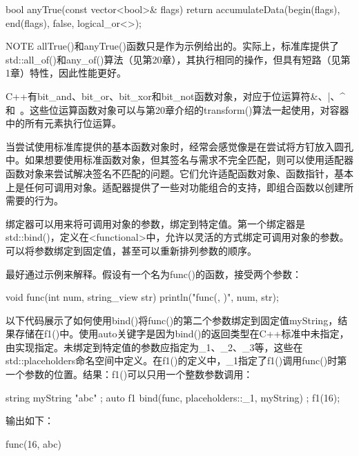\begin{cpp}
bool anyTrue(const vector<bool>& flags)
{
    return accumulateData(begin(flags), end(flags), false, logical_or<>{});
}
\end{cpp}

\begin{myNotic}{NOTE}
allTrue()和anyTrue()函数只是作为示例给出的。实际上，标准库提供了std::all\_of()和any\_of()算法（见第20章），其执行相同的操作，但具有短路（见第1章）特性，因此性能更好。
\end{myNotic}


C++有bit\_and、bit\_or、bit\_xor和bit\_not函数对象，对应于位运算符\&、|、\^{}和~。这些位运算函数对象可以与第20章介绍的transform()算法一起使用，对容器中的所有元素执行位运算。


当尝试使用标准库提供的基本函数对象时，经常会感觉像是在尝试将方钉放入圆孔中。如果想要使用标准函数对象，但其签名与需求不完全匹配，则可以使用适配器函数对象来尝试解决签名不匹配的问题。它们允许适配函数对象、函数指针，基本上是任何可调用对象。适配器提供了一些对功能组合的支持，即组合函数以创建所需要的行为。


绑定器可以用来将可调用对象的参数，绑定到特定值。第一个绑定器是std::bind()，定义在<functional>中，允许以灵活的方式绑定可调用对象的参数。可以将参数绑定到固定值，甚至可以重新排列参数的顺序。

最好通过示例来解释。假设有一个名为func()的函数，接受两个参数：

\begin{cpp}
void func(int num, string_view str)
{
    println("func({}, {})", num, str);
}
\end{cpp}

以下代码展示了如何使用bind()将func()的第二个参数绑定到固定值myString，结果存储在f1()中。使用auto关键字是因为bind()的返回类型在C++标准中未指定，由实现指定。未绑定到特定值的参数应指定为\_1、\_2、\_3等，这些在std::placeholders命名空间中定义。在f1()的定义中，\_1指定了f1()调用func()时第一个参数的位置。结果：f1()可以只用一个整数参数调用：

\begin{cpp}
string myString { "abc" };
auto f1 { bind(func, placeholders::_1, myString) };
f1(16);
\end{cpp}

输出如下：

\begin{shell}
func(16, abc)
\end{shell}

